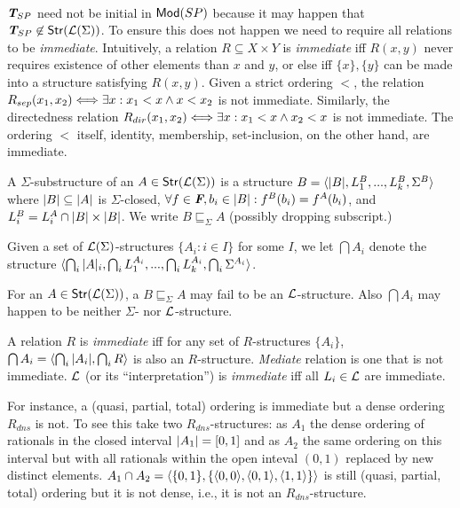 \documentclass[12pt]{article}
\begin{document}
\newpage
{}\\
${\mbox{\bf{\em T}}}_{SP}$ need not be initial in ${\sf {Mod}}(SP)$ because it may happen that
${\mbox{\bf{\em T}}}_{SP}\not\in{\sf {Str}}({{\cal{L}}}(\Sigma))$.
To ensure this does not happen we need to require all relations to
be {\em immediate}. 
Intuitively, a relation $R\subseteq X\times Y$ is {\em immediate} iff 
$R(x,y)$ never requires existence of other elements than $x$ and
$y$, or else iff $\{x\},\{y\}$ can be made into a structure
satisfying $R(x,y)$. 
Given a strict ordering $<$, the relation $R_{sep}(x_1,x_2)\Longleftrightarrow
\exists x: x_1<x\land x<x_2$ is not immediate. Similarly, the directedness relation
$R_{dir}(x_1,x_2)\Longleftrightarrow \exists x: x_1<x\land x_2<x$ is not immediate. 
The ordering $<$ itself, identity, membership, set-inclusion, on
the other hand, are immediate.

\begin{Definition}
A $\Sigma$-substructure of an $A\in{\sf {Str}}({{\cal{L}}}(\Sigma))$ is a structure $B=\langle|B|, L_1^B,...,L_k^B,\Sigma^B\rangle$ where $|B|\subseteq|A|$ is
$\Sigma$-closed,  $\forall f\in\mbox{\bf{\em F}}, b_i\in|B|: f^B(b_i)=f^A(b_i)$, and $L_i^B=L_i^A\cap
|B|\times|B|$. We write $B\sqsubseteq_\Sigma A$ (possibly dropping subscript.)

Given a set of ${{\cal{L}}}(\Sigma)$-structures $\{A_i:i\in I\}$ for some $I$, we 
let $\bigcap A_i$ denote the structure $\langle\bigcap_i{|A|_i},\bigcap_iL_1^{A_{i}},..., \bigcap_iL_k^{A_{i}},
\bigcap_i\Sigma^{A_{i}}\rangle$.
\end{Definition}
For an $A\in{\sf {Str}}({{\cal{L}}}(\Sigma))$, a $B\sqsubseteq_\Sigma A$ may fail to be an
${{\cal{L}}}$-structure. Also $\bigcap A_i$ may happen to be neither $\Sigma$- nor ${{\cal{L}}}$-structure.
\begin{Definition}\label{Odef:immed}
A relation $R$ is {\em immediate} iff for  any set of
$R$-structures $\{A_i\}$, 
$\bigcap A_i= \langle\bigcap_i|A_i|,\bigcap_i R\rangle$ 
is also an $R$-structure.
{\em Mediate} relation is one that is not
immediate. 
${{\cal{L}}}$ (or its ``interpretation'') is {\em immediate} iff all $L_i\in{{\cal{L}}}$ are immediate.
\end{Definition}
For instance, a (quasi, partial, total)  ordering is immediate but a
dense ordering $R_{dns}$ is not. To see this take two $R_{dns}$-structures: as $A_1$ the dense ordering of
rationals in the closed interval $|A_1|=[0,1]$ and as $A_2$ the same
ordering on this interval
but with all rationals within the open inteval $(0,1)$ replaced by new distinct
elements. $A_1\cap A_2=\langle\{0,1\},\{\langle0,0\rangle,\langle0,1\rangle,\langle1,1\rangle\}\rangle$ is still (quasi, partial, total) ordering but it
is not dense, i.e., it is not an $R_{dns}$-structure.
\end{document}
